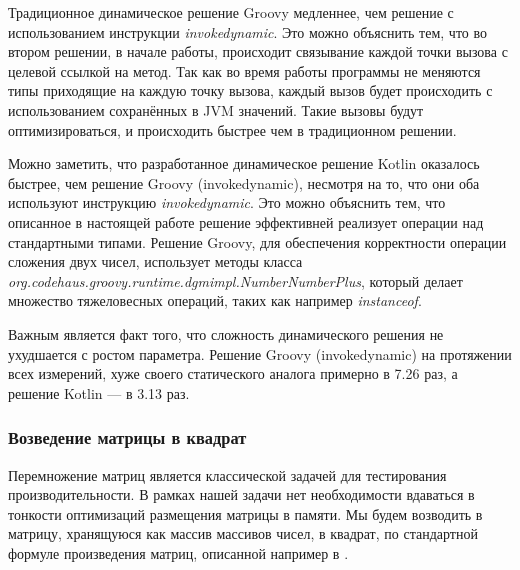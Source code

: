 Традиционное динамическое решение Groovy медленнее, чем решение с использованием инструкции \textit{invokedynamic}. Это можно объяснить тем, что во втором решении, в начале работы, происходит связывание каждой точки вызова с целевой ссылкой на метод. Так как во время работы программы не меняются типы приходящие на каждую точку вызова, каждый вызов будет происходить с использованием сохранённых в JVM значений. Такие вызовы будут оптимизироваться, и происходить быстрее чем в традиционном решении.

Можно заметить, что разработанное динамическое решение Kotlin оказалось быстрее, чем решение Groovy (invokedynamic), несмотря на то, что они оба используют инструкцию \textit{invokedynamic}. Это можно объяснить тем, что описанное в настоящей работе решение эффективней реализует операции над  стандартными типами. Решение Groovy, для обеспечения корректности операции сложения двух чисел, использует методы класса \textit{org.codehaus.groovy.runtime.dgmimpl.NumberNumberPlus}, который делает множество тяжеловесных операций, таких как например \textit{instanceof}.

Важным является факт того, что сложность динамического решения не ухудшается с ростом параметра. Решение Groovy (invokedynamic) на протяжении всех измерений, хуже своего статического аналога примерно в 7.26 раз, а решение Kotlin --- в 3.13 раз.

\subsubsection{Возведение матрицы в квадрат}

Перемножение матриц является классической задачей для тестирования производительности. В рамках нашей задачи нет необходимости вдаваться в тонкости оптимизаций размещения матрицы в памяти. Мы будем возводить в матрицу, хранящуюся как массив массивов чисел, в квадрат, по стандартной формуле произведения матриц, описанной например в \cite{book:KryakvinVadimDLinAlgebra}. 



